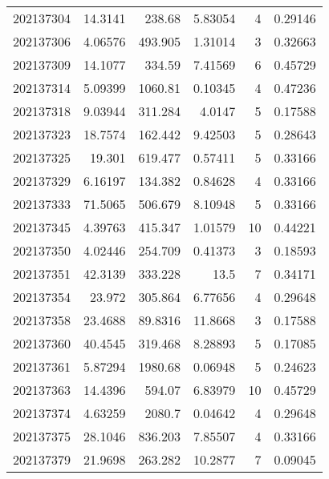\begin{tabular}{rrrrrr}
 202137304 &         14.3141  &      238.68   &            5.83054 &           4 & 0.29146 \\
 202137306 &          4.06576 &      493.905  &            1.31014 &           3 & 0.32663 \\
 202137309 &         14.1077  &      334.59   &            7.41569 &           6 & 0.45729 \\
 202137314 &          5.09399 &     1060.81   &            0.10345 &           4 & 0.47236 \\
 202137318 &          9.03944 &      311.284  &            4.0147  &           5 & 0.17588 \\
 202137323 &         18.7574  &      162.442  &            9.42503 &           5 & 0.28643 \\
 202137325 &         19.301   &      619.477  &            0.57411 &           5 & 0.33166 \\
 202137329 &          6.16197 &      134.382  &            0.84628 &           4 & 0.33166 \\
 202137333 &         71.5065  &      506.679  &            8.10948 &           5 & 0.33166 \\
 202137345 &          4.39763 &      415.347  &            1.01579 &          10 & 0.44221 \\
 202137350 &          4.02446 &      254.709  &            0.41373 &           3 & 0.18593 \\
 202137351 &         42.3139  &      333.228  &           13.5     &           7 & 0.34171 \\
 202137354 &         23.972   &      305.864  &            6.77656 &           4 & 0.29648 \\
 202137358 &         23.4688  &       89.8316 &           11.8668  &           3 & 0.17588 \\
 202137360 &         40.4545  &      319.468  &            8.28893 &           5 & 0.17085 \\
 202137361 &          5.87294 &     1980.68   &            0.06948 &           5 & 0.24623 \\
 202137363 &         14.4396  &      594.07   &            6.83979 &          10 & 0.45729 \\
 202137374 &          4.63259 &     2080.7    &            0.04642 &           4 & 0.29648 \\
 202137375 &         28.1046  &      836.203  &            7.85507 &           4 & 0.33166 \\
 202137379 &         21.9698  &      263.282  &           10.2877  &           7 & 0.09045 \\

\end{tabular}
